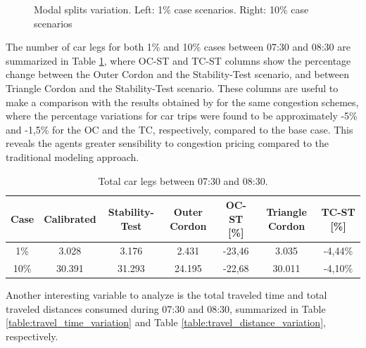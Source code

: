 \documentclass[Journal,letterpaper]{ascelike-new}
\begin{document}
\begin{figure}[h!]
	\caption{Modal splits variation. Left: 1\% case scenarios. Right: 10\% case scenarios}
	\label{fig:modal_split_results}
\end{figure}

The number of car legs for both 1\% and 10\% cases between 07:30 and 08:30 are summarized in Table \ref{table:legs_variation}, where OC-ST and TC-ST columns show the percentage change between the Outer Cordon and the Stability-Test scenario, and between Triangle Cordon and the Stability-Test scenario. These columns are useful to make a comparison with the results obtained by \cite{gleave2009tarificacion} for the same congestion schemes, where the percentage variations for car trips were found to be approximately -5\% and -1,5\% for the OC and the TC, respectively, compared to the base case. This reveals the agents greater sensibility to congestion pricing compared to the traditional modeling approach.

\begin{table}[h!]
	\centering
	\caption{Total car legs between 07:30 and 08:30.}
	\label{table:legs_variation}
	\begin{tabular}{ccc|cc|cc}
		\hline
		Case	& Calibrated & Stability-Test & Outer Cordon & OC-ST [\%] & Triangle Cordon & TC-ST [\%] \\
		\hline
		 1\%  & 3.028  & 3.176  & 2.431  & -23,46 & 3.035  & -4,44\% \\
		 10\% & 30.391 & 31.293 & 24.195 & -22,68 & 30.011 & -4,10\% \\
		\hline          
	\end{tabular}
\end{table}
Another interesting variable to analyze is the total traveled time and total traveled distances consumed during 07:30 and 08:30, summarized in Table \ref{table:travel_time_variation} and Table \ref{table:travel_distance_variation}, respectively.
\end{document}
